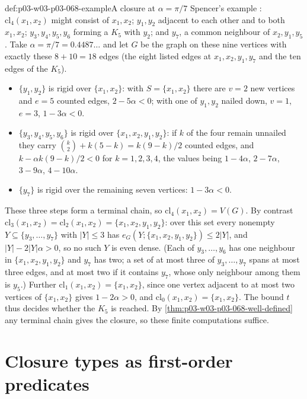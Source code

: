 \begin{hbexample}{def:p03-w03-p03-068-example}{A closure at \(\alpha=\pi/7\)}
Spencer's example \cite[p.~8]{Spencer2007LogicRandomStructuresAuthor}: \(\mathrm{cl}_4(x_1,x_2)\)
might consist of \(x_1,x_2\); \(y_1,y_2\) adjacent to each other and to both
\(x_1,x_2\); \(y_3,y_4,y_5,y_6\) forming a \(K_5\) with \(y_2\); and \(y_7\), a
common neighbour of \(x_2,y_1,y_5\).  Take \(\alpha=\pi/7=0.4487\ldots\) and
let \(G\) be the graph on these nine vertices with exactly these \(8+10=18\)
edges (the eight listed edges at \(x_1,x_2,y_1,y_7\) and the ten edges of the
\(K_5\)).
\begin{itemize}
\item \(\{y_1,y_2\}\) is rigid over \(\{x_1,x_2\}\): with \(S=\{x_1,x_2\}\)
there are \(v=2\) new vertices and \(e=5\) counted edges, \(2-5\alpha<0\); with
one of \(y_1,y_2\) nailed down, \(v=1\), \(e=3\), \(1-3\alpha<0\).
\item \(\{y_3,y_4,y_5,y_6\}\) is rigid over \(\{x_1,x_2,y_1,y_2\}\): if \(k\)
of the four remain unnailed they carry \(\binom k2+k(5-k)=k(9-k)/2\) counted
edges, and \(k-\alpha k(9-k)/2<0\) for \(k=1,2,3,4\), the values being
\(1-4\alpha\), \(2-7\alpha\), \(3-9\alpha\), \(4-10\alpha\).
\item \(\{y_7\}\) is rigid over the remaining seven vertices: \(1-3\alpha<0\).
\end{itemize}
These three steps form a terminal chain, so \(\mathrm{cl}_4(x_1,x_2)=V(G)\).
By contrast \(\mathrm{cl}_3(x_1,x_2)=\mathrm{cl}_2(x_1,x_2)=\{x_1,x_2,y_1,y_2\}\):
over this set every nonempty \(Y\subseteq\{y_3,\ldots,y_7\}\) with
\(|Y|\leq3\) has \(e_G(Y;\{x_1,x_2,y_1,y_2\})\leq2|Y|\), and
\(|Y|-2|Y|\alpha>0\), so no such \(Y\) is even dense.  (Each of
\(y_3,\ldots,y_6\) has one neighbour in \(\{x_1,x_2,y_1,y_2\}\) and \(y_7\)
has two; a set of at most three of \(y_3,\ldots,y_7\) spans at most three
edges, and at most two if it contains \(y_7\), whose only neighbour among
them is \(y_5\).)  Further
\(\mathrm{cl}_1(x_1,x_2)=\{x_1,x_2\}\), since one vertex adjacent to at most
two vertices of \(\{x_1,x_2\}\) gives \(1-2\alpha>0\), and
\(\mathrm{cl}_0(x_1,x_2)=\{x_1,x_2\}\).  The bound \(t\) thus decides whether
the \(K_5\) is reached.  By \cref{thm:p03-w03-p03-068-well-defined} any
terminal chain gives the closure, so these finite computations suffice.
\end{hbexample}

\section{Closure types as first-order predicates}
\label{sec:p03-w03-p03-068-types}

